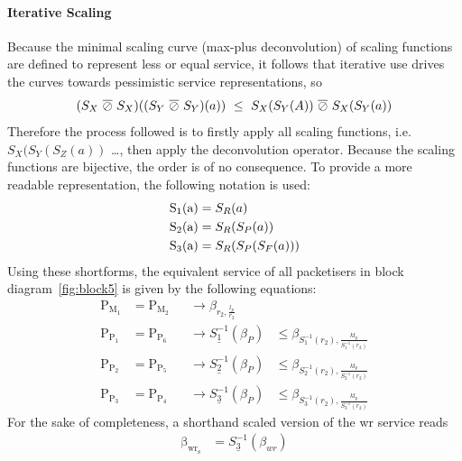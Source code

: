 \paragraph{Iterative Scaling}
Because the minimal scaling curve (max-plus deconvolution) of scaling functions are defined to represent less or equal service, it follows that iterative use drives the curves towards pessimistic service representations, so
\begin{equation}
\notag
(S_X \phantom{~}\overline{\oslash}\phantom{~} S_X) ((S_Y \phantom{~}\overline{\oslash}\phantom{~} S_Y)(a)) \phantom{~}  \le \phantom{~} S_X(S_Y(A)) \phantom{~}\overline{\oslash}\phantom{~} S_X(S_Y(a))
\end{equation}
Therefore the process followed is to firstly apply all scaling functions, i.e. $S_X(S_Y(S_Z(a))$ \dots, then apply the deconvolution operator. Because the scaling functions are bijective, the order is of no consequence.
To provide a more readable representation, the following notation is used:
%
\begin{equation}
\begin{aligned}
\notag
\mathrm{ S_1(a)} &= S_R(a)\\
\mathrm{ S_2(a)} &= S_R(S_P(a))\\
\mathrm{ S_3(a)} &= S_R(S_P(S_F(a)))
\label{eq:scaling-shorthand}
\end{aligned}
\end{equation}
%
Using these shortforms, the equivalent service of all packetisers in block diagram~\ref{fig:block5} is given by the following equations:
\begin{align}
\mathrm{P_{M_1}} &=  \mathrm{P_{M_2}} &&\to \beta_{r_2, \frac{l_p}{r_2}}&\phantom{~}\\[6pt]
\mathrm{P_{P_1}} &=  \mathrm{P_{P_6}} &&\to \underline{S^{-1}_1} \left ( \beta_{P} \right) &\le \beta_{S^{-1}_1(r_2), \frac{kl_p}{S^{-1}_1(r_2)}}\\[6pt]
\mathrm{P_{P_2}} &=  \mathrm{P_{P_5}} &&\to \underline{S^{-1}_2} \left ( \beta_{P} \right) &\le \beta_{S^{-1}_2(r_2), \frac{kl_p}{S^{-1}_2(r_2)}}\\[6pt]
\mathrm{P_{P_3}} &=  \mathrm{P_{P_4}} &&\to \underline{S^{-1}_3} \left ( \beta_{P} \right) &\le \beta_{S^{-1}_3(r_2), \frac{kl_p}{S^{-1}_3(r_2)}}
\label{eq:pack_serv}
\end{align}
%
For the sake of completeness, a shorthand scaled version of the \gls{wr} service reads
\begin{align}
\mathrm{\beta_{wr_s}} &=  \underline{S^{-1}_3} \left ( \beta_{wr} \right)
\label{eq:wr-serv-concat}
\end{align}

